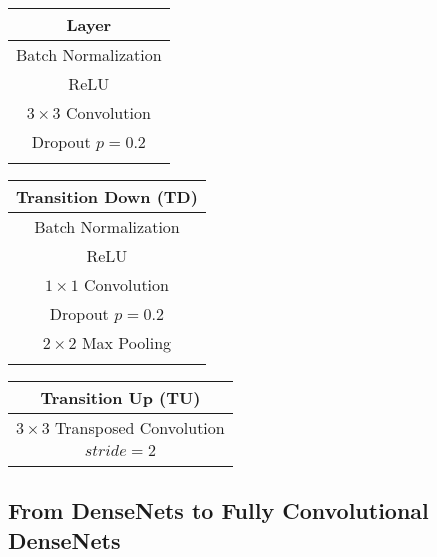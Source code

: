 \documentclass[10pt,twocolumn,letterpaper]{article}
\begin{document}
\begin{table*}[!htb]
    \begin{minipage}{.3\linewidth}
\centering
        \begin{tabular}{| c |}
\hline 
\textbf{Layer} \\ \hline \hline
Batch Normalization \\ \hline 
ReLU \\ \hline 
$3\times3$ Convolution \\ \hline Dropout $p=0.2$ \\ \hline   
\multicolumn{1}{c}{} \\
\end{tabular}
    \end{minipage}\begin{minipage}{.3\linewidth}
      \centering
\begin{tabular}{| c |}
\hline  
\textbf{Transition Down (TD)} \\ \hline \hline 
Batch Normalization \\ \hline 
ReLU \\ \hline 
$1\times1$ Convolution  \\ \hline 
Dropout  $p=0.2$ \\ \hline  
$2\times2$ Max Pooling \\ \hline  
\multicolumn{1}{c}{} \\
\end{tabular}
    \end{minipage} 
     \begin{minipage}{.3\linewidth}
\centering
        \begin{tabular}{| c |}
\hline  
\textbf{Transition Up (TU)} \\ \hline \hline 
$3\times3$ Transposed Convolution \\ $stride=2$   \\ \hline
\multicolumn{1}{c}{} \\
\end{tabular}
    \end{minipage}\caption{Building blocks of fully convolutional DenseNets. From left to right: layer used in the model, Transition Down (TD) and Transition Up (TU). See text for details.}
\label{tab:blocks}
\end{table*}


\subsection{From DenseNets to Fully Convolutional DenseNets}
\label{ssec:fcdensenets}
\end{document}
